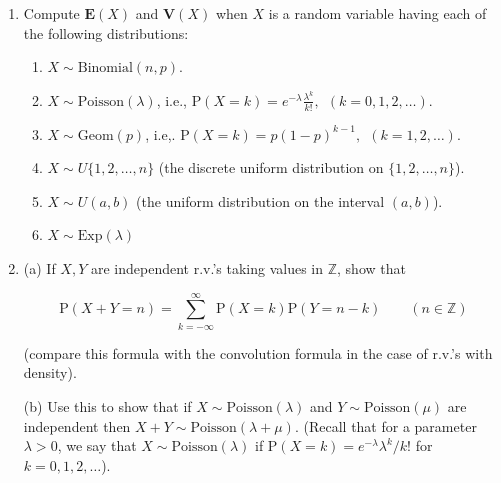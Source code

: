\documentclass[11pt]{report}
\newcommand{\Z}{\mathbb{Z}}
\theoremstyle{plain}
\theoremstyle{definition}
\begin{document}
\begin{enumerate}[label=\arabic*.]
\[
\pi_n(k) = \#\{1\le j\le n : X_j \le X_k\}.
\]
 By considering the joint density $f_{X_1,\ldots,X_n}$ (a uniform density on the $n$-dimensional unit cube), show that $\pi_n$ is a uniformly random permutation of $n$ elements, i.e. $\mathrm{P}(\pi_n = \sigma) = 1/n!$ for any permutation $\sigma \in S_n$. Deduce that the event $A_n = \{\pi_n(n)=n\}$ is independent of $\pi_{n-1}$ and therefore is independent of the previous events $(A_1,\ldots,A_{n-1})$, which are all determined by $\pi_{n-1}$.

(b) Define

\[
R_n = \sum_{k=1}^n 1_{A_k} = \#\{ 1\le k\le n: k\textrm{ is a record time} \}, \qquad (n=1,2,\ldots).
\]

Compute $\mathbf{E}(R_n)$ and $\mathbf{V}(R_n)$. Deduce that if $(m_n)_{n=1}^\infty$ is a sequence of positive numbers such that $m_n \uparrow \infty$, however slowly, then the number $R_n$ of record times up to time $n$ satisfies

\[
\mathrm{P}\left(|R_n - \log n|>m_n \sqrt{\log n}\right) \xrightarrow[n\to\infty]{} 0.
\]
\item Compute $\mathbf{E}(X)$ and $\mathbf{V}(X)$ when $X$ is a random variable having each of the following distributions:

\begin{enumerate}[label=\arabic*.]
\item $X \sim \textrm{Binomial}(n,p)$.
\item $X \sim \textrm{Poisson}(\lambda)$, i.e., $\mathrm{P}(X=k)=e^{-\lambda} \frac{\lambda^k}{k!}, \ \ (k=0,1,2,\ldots)$.
\item $X \sim \textrm{Geom}(p)$, i.e,. $\mathrm{P}(X=k)=p(1-p)^{k-1}, \ \ (k=1,2,\ldots)$.
\item $X \sim U\{1,2,\ldots,n\}$ (the discrete uniform distribution on $\{1,2,\ldots,n\}$).
\item $X \sim U(a,b)$ (the uniform distribution on the interval $(a,b)$).
\item $X \sim \textrm{Exp}(\lambda)$
\end{enumerate}
\item (a) If $X,Y$ are independent r.v.'s taking values in $\Z$, show that

\[
\mathrm{P}(X+Y = n) = \sum_{k=-\infty}^\infty \mathrm{P}(X=k) \mathrm{P}(Y=n-k) \qquad(n\in\Z)
\]

(compare this formula with the convolution formula in the case of r.v.'s with density).

(b) Use this to show that if $X\sim \textrm{Poisson}(\lambda)$ and $Y\sim \textrm{Poisson}(\mu)$ are independent then
$X+Y \sim \textrm{Poisson}(\lambda+\mu)$. (Recall that for a parameter $\lambda>0$, we say that $X\sim \textrm{Poisson}(\lambda)$ if $\mathrm{P}(X=k)=e^{-\lambda} \lambda^k/k!$ for $k=0,1,2,\ldots$).


\end{enumerate}
\end{document}
